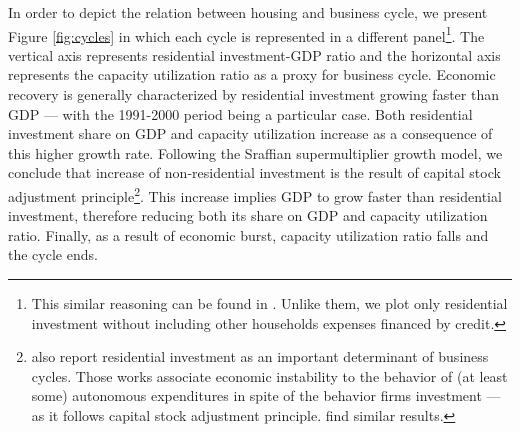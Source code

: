 \documentclass[11pt]{article}
\begin{document}
In order to depict the relation between housing and business cycle, we present Figure \ref{fig:cycles} in which each cycle is represented in a different panel\footnote{This similar reasoning can be found in \textcite{fiebiger_trend_2017}. Unlike them, we plot only residential investment without including other households expenses financed by credit.}.
The vertical axis represents residential investment-GDP ratio and the horizontal axis represents the capacity utilization ratio  as a proxy for business cycle. Economic recovery is generally characterized by residential investment growing faster than GDP — with the 1991-2000 period being a particular case. Both residential investment share on GDP and capacity utilization increase as a consequence of this higher growth rate.
Following the Sraffian supermultiplier growth model, we conclude that increase of non-residential investment is the result of capital stock adjustment principle\footnote{\textcites{fiebiger_semi-autonomous_2018}{fiebiger_trend_2017} also report residential investment as an important determinant of business cycles. Those works associate economic instability to the behavior of (at least some) autonomous expenditures in spite of the behavior firms investment --- as it follows capital stock adjustment principle. \textcites{dejuan_hidden_2017}{teixeira_crescimento_2015} find similar results.}. This increase implies GDP to grow faster than residential investment, therefore reducing both its share on GDP and capacity utilization ratio. Finally, as a result of economic burst, capacity utilization ratio falls and the cycle ends.
\end{document}
